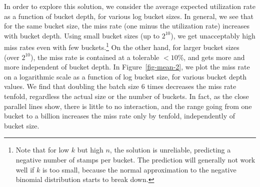 \documentclass[
  letterpaper,
  DIV=11,
  numbers=noendperiod]{scrartcl}
\begin{document}
In order to explore this solution, we consider the average expected
utilization rate as a function of bucket depth, for various log bucket
sizes. In general, we see that for the same bucket size, the miss rate
(one minus the utilization rate) increases with bucket depth. Using
small bucket sizes (up to $2^{10}$), we get unacceptably high miss
rates even with few buckets.\footnote{Note that for low $k$ but high
  $n$, the solution is unreliable, predicting a negative number of
  stamps per bucket. The prediction will generally not work well if
  $k$ is too small, because the normal approximation to the negative
  binomial distribution starts to break down.} On the other hand, for
larger bucket sizes (over $2^{10}$), the miss rate is contained at a
tolerable $<10\%$, and gets more and more independent of bucket depth.
In Figure~\ref{fig-mean-2}, we plot the miss rate on a logarithmic scale
as a function of log bucket size, for various bucket depth values. We
find that doubling the batch size 6 times decreases the miss rate
tenfold, regardless the actual size or the number of buckets. In fact,
as the close parallel lines show, there is little to no interaction, and
the range going from one bucket to a billion increases the miss rate
only by tenfold, independently of bucket size.
\end{document}
